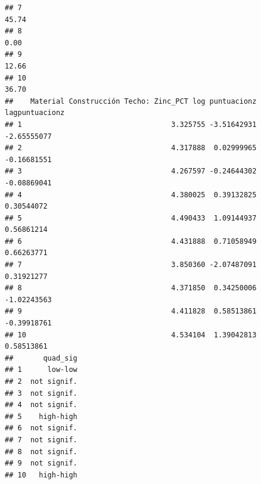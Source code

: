 \documentclass[11pt,]{article}
\newenvironment{Shaded}{\begin{snugshade}}{\end{snugshade}}
\newcommand{\KeywordTok}[1]{\textcolor[rgb]{0.13,0.29,0.53}{\textbf{#1}}}
\newcommand{\DataTypeTok}[1]{\textcolor[rgb]{0.13,0.29,0.53}{#1}}
\newcommand{\StringTok}[1]{\textcolor[rgb]{0.31,0.60,0.02}{#1}}
\newcommand{\CommentTok}[1]{\textcolor[rgb]{0.56,0.35,0.01}{\textit{#1}}}
\newcommand{\OperatorTok}[1]{\textcolor[rgb]{0.81,0.36,0.00}{\textbf{#1}}}
\newcommand{\NormalTok}[1]{#1}
\begin{document}
\begin{verbatim}
## 7                                                                   45.74
## 8                                                                    0.00
## 9                                                                   12.66
## 10                                                                  36.70
##    Material Construcción Techo: Zinc_PCT log puntuacionz lagpuntuacionz
## 1                                   3.325755 -3.51642931    -2.65555077
## 2                                   4.317888  0.02999965    -0.16681551
## 3                                   4.267597 -0.24644302    -0.08869041
## 4                                   4.380025  0.39132825     0.30544072
## 5                                   4.490433  1.09144937     0.56861214
## 6                                   4.431888  0.71058949     0.66263771
## 7                                   3.850360 -2.07487091     0.31921277
## 8                                   4.371850  0.34250006    -1.02243563
## 9                                   4.411828  0.58513861    -0.39918761
## 10                                  4.534104  1.39042813     0.58513861
##       quad_sig
## 1      low-low
## 2  not signif.
## 3  not signif.
## 4  not signif.
## 5    high-high
## 6  not signif.
## 7  not signif.
## 8  not signif.
## 9  not signif.
## 10   high-high
\end{verbatim}

\begin{Shaded}
\end{Shaded}
\end{document}
